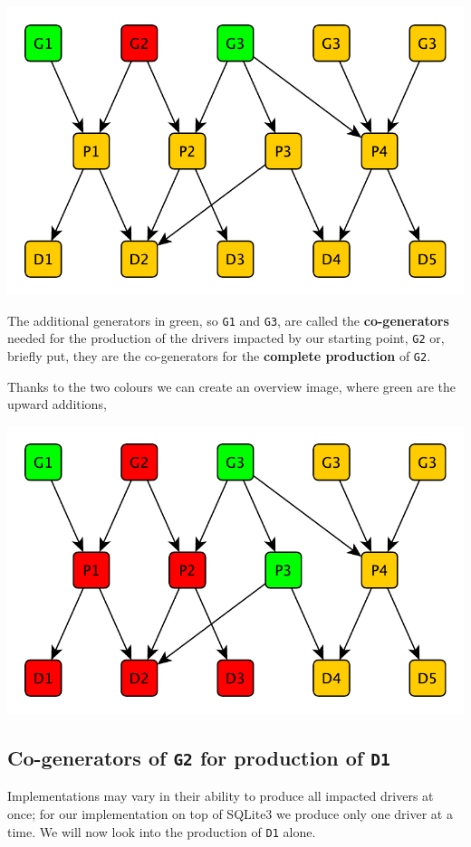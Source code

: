 \documentclass[a4paper]{article}
\def\G#1{\texttt{G#1}\xspace}
\def\D#1{\texttt{D#1}\xspace}
\begin{document}
\centerline{\includegraphics[scale=0.5]{img/network5-gensneeded.pdf}}

The additional generators in green, so \G1 and \G3, are called the \textbf{co-generators} needed for the production of the drivers impacted by our starting point, \G2 or, briefly put, they are the co-generators for the \textbf{complete production} of \G2.

Thanks to the two colours we can create an overview image, where green are the upward additions,

\centerline{\includegraphics[scale=0.5]{img/network6-combined.pdf}}

\subsection{Co-generators of \G2 for production of \D1}

Implementations may vary in their ability to produce all impacted drivers at once; for our implementation on top of SQLite3 we produce only one driver at a time.  We will now look into the production of \D1 alone.
\end{document}
